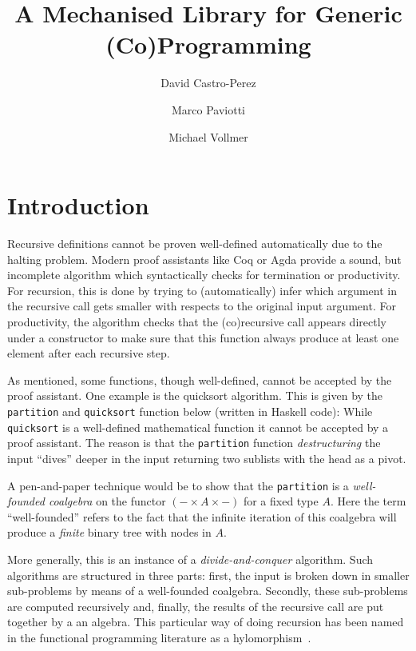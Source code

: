 \documentclass[anonymous, a4paper, UKenglish, cleveref, autoref, thm-restate]{lipics-v2021}
\title{A Mechanised Library for Generic (Co)Programming}
\author{David Castro-Perez}{School of Computing, University of Kent}{d-castro-perez@kent.ac.uk}{}{}
\author{Marco Paviotti}{School of Computing, University of Kent}{m.paviotti@kent.ac.uk}{}{}
\author{Michael Vollmer}{School of Computing, University of Kent}{m.vollmer@kent.ac.uk}{}{}
\newcommand{\haskell}[1]{\texttt{#1}}
\begin{document}
\maketitle

\begin{abstract}

\end{abstract}

\section{Introduction}
\label{sec:intro}
Recursive definitions cannot be proven well-defined automatically due to the
halting problem. Modern proof assistants like Coq or Agda provide a sound, but
incomplete algorithm which syntactically checks for termination or productivity.
For recursion, this is done by trying to (automatically) infer which argument in
the recursive call gets smaller with respects to the original input argument.
For productivity, the algorithm checks that the (co)recursive call appears
directly under a constructor to make sure that this function always produce at
least one element after each recursive step.

As mentioned, some functions, though well-defined, cannot be accepted by the
proof assistant. One example is the quicksort algorithm. This is given by the
\haskell{partition} and \haskell{quicksort} function below (written in Haskell
code):
While \haskell{quicksort} is a well-defined mathematical function it cannot be
accepted by a proof assistant.  The reason is that the \haskell{partition}
function \emph{destructuring} the input ``dives'' deeper in the input returning
two sublists with the head as a pivot.

A pen-and-paper technique would be to show that the \haskell{partition} is a
\emph{well-founded coalgebra} on the functor $(- \times A \times -)$ for a fixed
type $A$. Here the term ``well-founded'' refers to the fact that the infinite
iteration of this coalgebra will produce a \emph{finite} binary tree with nodes
in $A$.

More generally, this is an instance of a \emph{divide-and-conquer} algorithm.
Such algorithms are structured in three parts: first, the input is broken down
in smaller sub-problems by means of a well-founded coalgebra. Secondly, these
sub-problems are computed recursively and, finally, the results of the recursive
call are put together by a an algebra. This particular way of doing recursion
has been named in the functional programming literature as a
hylomorphism~\cite{MeijerFP91, HuIT96}.
\end{document}
